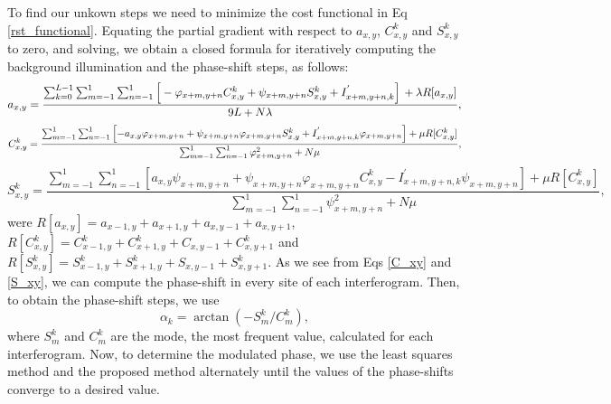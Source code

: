 \documentclass[letterpaper,12pt]{article}   %
\begin{document}
  To find our unkown steps we need to minimize the cost functional in
  Eq \ref{rst_functional}. Equating the partial gradient with respect
  to $a_{x,y}$, $C_{x,y}^k$ and $S_{x,y}^k$ to zero, and solving, we
  obtain a closed formula for iteratively computing the background
  illumination and the phase-shift steps, as follows:
  \begin{equation}
    a_{x,y} = \frac{ \sum_{k=0}^{L-1} \sum_{m=-1}^{1} \sum_{n=-1}^{1} \left[\\
	-\varphi_{x+m,y+n}C_{x,y}^k+\psi_{x+m,y+n}S_{x,y}^k+I_{x+m,y+n,k}^{'} \right] \\
      + \lambda R[a_{x,y}] }
    { 9L + N \lambda},
  \end{equation}
  \begin{equation}\label{C_xy}
    C_{x,y}^k = \frac{ \sum_{m=-1}^{1} \sum_{n=-1}^{1} \left[ -a_{x,y} \varphi_{x+m,y+n}+
	\psi_{x+m,y+n} \varphi_{x+m,y+n} S_{x,y}^k +\\ 		I_{x+m,y+n,k}^{'}
	\varphi_{x+m,y+n} \right] + \mu R[C_{x,y}^k] }
    { \sum_{m=-1}^{1} \sum_{n=-1}^{1} \varphi_{x+m,y+n}^2 + N \mu },
  \end{equation}
  \begin{equation}\label{S_xy}
    S_{x,y}^k = \frac{ \sum_{m=-1}^{1} \sum_{n=-1}^{1} \left[ a_{x,y} \psi_{x+m,y+n} +
	\psi_{x+m,y+n} \varphi_{x+m,y+n} C_{x,y}^k-I_{x+m,y+n,k}^{'} \psi_{x+m,y+n} \right] 
      + \mu R[C_{x,y}^k]}
    { \sum_{m=-1}^{1} \sum_{n=-1}^{1} \psi_{x+m,y+n}^2 + N \mu},
  \end{equation}
  were $R[a_{x,y}]=a_{x-1,y}+a_{x+1,y}+a_{x,y-1}+a_{x,y+1}$,
  $R[C_{x,y}^k]=C_{x-1,y}^k+C_{x+1,y}^k+C_{x,y-1}+C_{x,y+1}^k$ and
  $R[S_{x,y}^k]=S_{x-1,y}^k+S_{x+1,y}^k+S_{x,y-1}+S_{x,y+1}^k$. As we
  see from Eqs \ref{C_xy} and \ref{S_xy}, we can compute the
  phase-shift in every site of each interferogram. Then, to obtain the
  phase-shift steps, we use
  \begin{equation}
    \alpha_k = \arctan(-S_m^k/C_m^k),
  \end{equation}
  where $S_m^k$ and $C_m^k$ are the mode, the most frequent value,
  calculated for each interferogram. Now, to determine the modulated
  phase, we use the least squares method and the proposed method
  alternately until the values ​​of the phase-shifts converge to a
  desired value.

\end{document}
